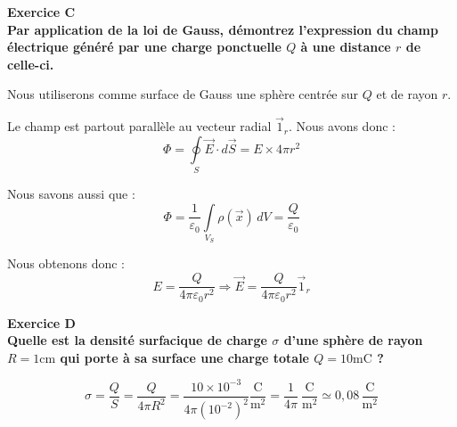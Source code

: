 \documentclass	[11pt, a4paper, openany]{book}
\newcommand{\E}{\vec E}
\newcommand{\exerc}[2]{\textbf{\Large Exercice #1\normalsize \\#2}}
\newcommand{\comment}[1]{}
\begin{document}
\comment{\vspace{0,5cm}

\exerc{B}{a) À faire sur papier}
	
	\textbf{b) Donnez l'expression analytique des ces champs et exprimez ces vecteurs dans le système d'axe $Oxy$.}
	
	\textbf{c) Déterminez l'expression analytique des composantes du champ résultant $\E (\vec x_1)$ apparaissant à l'endroit où se trouve $q_1$.}
	
	\textbf{d) Déduisez-en la norme de ce champ.}
	
	\textbf{e) Déduisez de cette valeur la norme de la force résultante exercée sur $q_1$. Comparez avec l'exercice A.}
	
	\textbf{f) Application numérique : $q_1 = -1\ \text{C}$, $q_2 = -0,9\ \text{C}$ et $q_3 = 1,6\ \text{C}$. Les axes $x$ et $y$ sont gradués en cm.}}

\vspace{0,5cm}

\exerc{C}{Par application de la loi de Gauss, démontrez l'expression du champ électrique généré par une charge ponctuelle $Q$ à une distance $r$ de celle-ci.}
	
	Nous utiliserons comme surface de Gauss une sphère centrée sur $Q$ et de rayon $r$.
	
	Le champ est partout parallèle au vecteur radial $\vec 1_r$. Nous avons donc : $$ \Phi = \oint  \limits_S \E \cdot d \vec S = E \times 4\pi r^2 $$
	
	Nous savons aussi que : $$ \Phi = \dfrac{1}{\varepsilon_0} \int \limits_{V_S} \rho (\vec x) \, dV = \dfrac{Q}{\varepsilon_0} $$
	
	Nous obtenons donc : $$ E = \dfrac{Q}{4\pi \varepsilon_0 r^2} \Rightarrow \vec E = \dfrac{Q}{4\pi \varepsilon_0 r^2} \vec 1_r $$

\vspace{0,5cm}

\exerc{D}{Quelle est la densité surfacique de charge $\sigma$ d'une sphère de rayon $R = 1\mathrm{cm}$ qui porte à sa surface une charge totale $Q = 10\mathrm{mC}$ ?}
	
	$$ \sigma = \dfrac{Q}{S} = \dfrac{Q}{4\pi R^2} = \dfrac{10\times 10^{-3}}{4\pi (10^{-2})^2} \dfrac{\mathrm{C}}{\mathrm{m}^2} = \dfrac{1}{4\pi}\ \dfrac{\mathrm{C}}{\mathrm{m}^2} \simeq 0,08\,\dfrac{\mathrm{C}}{\mathrm{m}^2}$$

\vspace{0,5cm}
		
\end{document}
